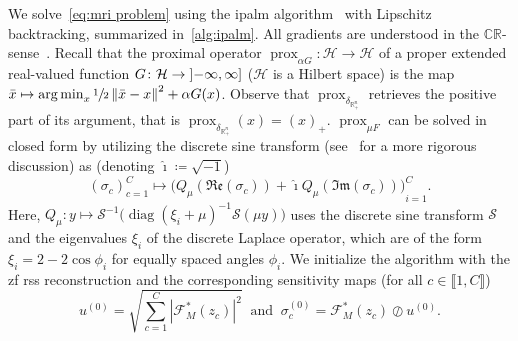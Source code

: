 \documentclass[twocolumn]{article}
\DeclareMathOperator*{\argmin}{arg\,min}
\DeclareMathOperator*{\prox}{prox}
\newcommand{\R}{\mathbb{R}}
\newcommand{\Function}[3]{#1\colon#2\to#3}
\newcommand{\set}[1]{\mathcal{#1}}
\newcommand{\norm}[1]{\left\lVert#1\right\rVert}
\begin{document}
We solve~\cref{eq:mri problem} using the \gls{ipalm} algorithm~\cite{pock_inertial_2016} with Lipschitz backtracking, summarized in~\cref{alg:ipalm}.
All gradients are understood in the \( \mathbb{C}\mathbb{R} \)-sense~\cite{kreutz_complex_2009}.
Recall that the proximal operator \( \Function{\prox_{\alpha G}}{\set{H}}{\set{H}} \) of a proper extended real-valued function \( \Function{G}{\mathcal{H}}{\interval[open left]{-\infty}{\infty}} \) (\( \mathcal{H} \) is a Hilbert space) is the map \( \bar{x} \mapsto \argmin_x \sfrac{1}{2} \norm{\bar{x} - x}^2 + \alpha G(x) \).
Observe that \( \prox_{\delta_{\R^n_+}} \) retrieves the positive part of its argument, that is \( \prox_{\delta_{\R^n_+}}(x) = {(x)}_+ \).
\( \prox_{\mu F} \) can be solved in closed form by utilizing the discrete sine transform (see~\cite[Chapter 19.4]{press_numerical_1992} for a more rigorous discussion) as (denoting \( \hat{\imath} \coloneqq \sqrt{-1} \))
\begin{equation}
	{(\sigma_c)}_{c=1}^C \mapsto {\big(Q_\mu(\mathfrak{Re}(\sigma_c)) + \hat{\imath} Q_\mu(\mathfrak{Im}(\sigma_c))\big)}_{i=1}^C.
\end{equation}
Here, \( Q_\mu \colon y \mapsto \mathcal{S}^{-1}\bigl({\operatorname{diag}(\xi_i + \mu)}^{-1}\mathcal{S}(\mu y) \bigr) \) uses the discrete sine transform \( \mathcal{S} \) and the eigenvalues \( \xi_i \) of the discrete Laplace operator, which are of the form \( \xi_i = 2 - 2 \cos \phi_i \) for equally spaced angles \( \phi_i \).
We initialize the algorithm with the \gls{zf} \gls{rss} reconstruction and the corresponding sensitivity maps (for all \( c \in \llbracket 1, C \rrbracket \))
\begin{equation}
	u^{(0)} = \sqrt{\sum_{c=1}^C|\mathcal{F}_M^*(z_c)|^2}\ \text{ and }\ \sigma_c^{(0)} = \mathcal{F}_M^*(z_c) \oslash u^{(0)}.%
	\label{eq:initial guess}
\end{equation}
\end{document}
